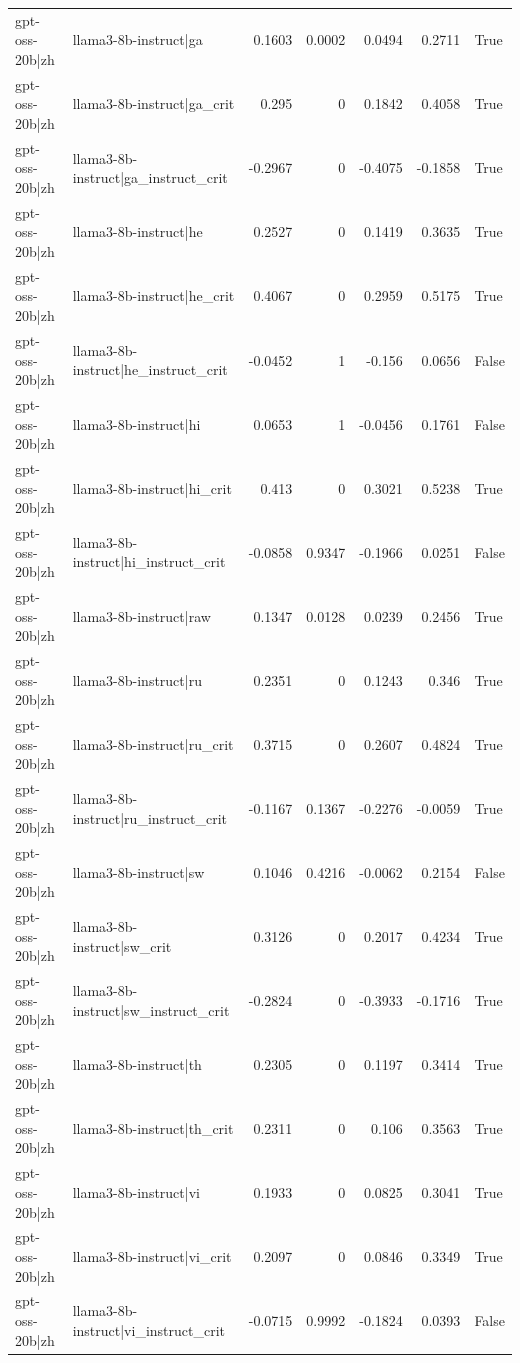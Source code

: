 \begin{table}
\begin{tabular}{l l r r r r l}
gpt-oss-20b|zh & llama3-8b-instruct|ga & 0.1603 & 0.0002 & 0.0494 & 0.2711 & True \\
gpt-oss-20b|zh & llama3-8b-instruct|ga_crit & 0.295 & 0 & 0.1842 & 0.4058 & True \\
gpt-oss-20b|zh & llama3-8b-instruct|ga_instruct_crit & -0.2967 & 0 & -0.4075 & -0.1858 & True \\
gpt-oss-20b|zh & llama3-8b-instruct|he & 0.2527 & 0 & 0.1419 & 0.3635 & True \\
gpt-oss-20b|zh & llama3-8b-instruct|he_crit & 0.4067 & 0 & 0.2959 & 0.5175 & True \\
gpt-oss-20b|zh & llama3-8b-instruct|he_instruct_crit & -0.0452 & 1 & -0.156 & 0.0656 & False \\
gpt-oss-20b|zh & llama3-8b-instruct|hi & 0.0653 & 1 & -0.0456 & 0.1761 & False \\
gpt-oss-20b|zh & llama3-8b-instruct|hi_crit & 0.413 & 0 & 0.3021 & 0.5238 & True \\
gpt-oss-20b|zh & llama3-8b-instruct|hi_instruct_crit & -0.0858 & 0.9347 & -0.1966 & 0.0251 & False \\
gpt-oss-20b|zh & llama3-8b-instruct|raw & 0.1347 & 0.0128 & 0.0239 & 0.2456 & True \\
gpt-oss-20b|zh & llama3-8b-instruct|ru & 0.2351 & 0 & 0.1243 & 0.346 & True \\
gpt-oss-20b|zh & llama3-8b-instruct|ru_crit & 0.3715 & 0 & 0.2607 & 0.4824 & True \\
gpt-oss-20b|zh & llama3-8b-instruct|ru_instruct_crit & -0.1167 & 0.1367 & -0.2276 & -0.0059 & True \\
gpt-oss-20b|zh & llama3-8b-instruct|sw & 0.1046 & 0.4216 & -0.0062 & 0.2154 & False \\
gpt-oss-20b|zh & llama3-8b-instruct|sw_crit & 0.3126 & 0 & 0.2017 & 0.4234 & True \\
gpt-oss-20b|zh & llama3-8b-instruct|sw_instruct_crit & -0.2824 & 0 & -0.3933 & -0.1716 & True \\
gpt-oss-20b|zh & llama3-8b-instruct|th & 0.2305 & 0 & 0.1197 & 0.3414 & True \\
gpt-oss-20b|zh & llama3-8b-instruct|th_crit & 0.2311 & 0 & 0.106 & 0.3563 & True \\
gpt-oss-20b|zh & llama3-8b-instruct|vi & 0.1933 & 0 & 0.0825 & 0.3041 & True \\
gpt-oss-20b|zh & llama3-8b-instruct|vi_crit & 0.2097 & 0 & 0.0846 & 0.3349 & True \\
gpt-oss-20b|zh & llama3-8b-instruct|vi_instruct_crit & -0.0715 & 0.9992 & -0.1824 & 0.0393 & False \\

\end{tabular}
\end{table}
